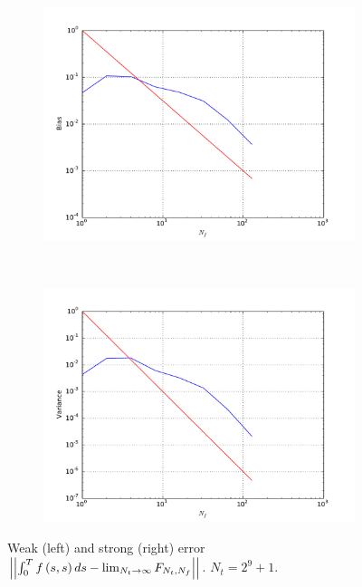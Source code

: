 \documentclass[11pt]{amsart}
\begin{document}
\begin{figure}
    \centering
    \begin{subfigure}[b]{0.4\textwidth}
        \includegraphics[width=\textwidth]{weakerr1.pdf}
    \end{subfigure}
    ~ %
    \begin{subfigure}[b]{0.4\textwidth}
        \includegraphics[width=\textwidth]{strongerr1.pdf}
    \end{subfigure}
    \caption{\label{fig:rateFig1} Weak (left) and strong (right) error
    $\left| {\left| {{\int_0^T f \left( {s,s} \right) ds - \lim_{N_t \rightarrow \infty} F_{N_t,N_f}}} \right|} \right|_{}$. $N_t= 2^9+1$.}
\end{figure}
\end{document}
